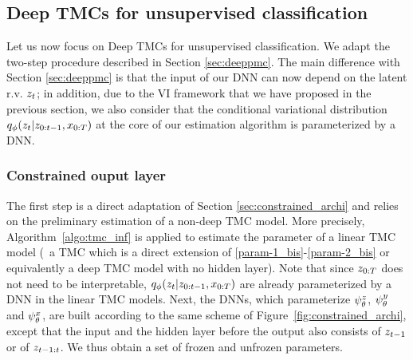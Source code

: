 \subsection{Deep TMCs for unsupervised classification}
\label{sec-deep-tmc}
Let us now focus on Deep TMCs for unsupervised classification.
We adapt the two-step procedure described in Section \ref{sec:deeppmc}. The main
difference with Section \ref{sec:deeppmc} is that the input of our DNN can now depend on the latent r.v. $z_t$; in addition, 
due to the VI framework that we have proposed in the previous section, we also consider that the conditional variational distribution $q_\phi(z_t|z_{0:t-1},x_{0:T})$ at the
core of our estimation algorithm is parameterized by a DNN.


\subsubsection{Constrained ouput layer}
\label{constraint-tmc}
The first step is a direct adaptation of Section \ref{sec:constrained_archi} and relies on the preliminary estimation of a non-deep TMC model.
More precisely,  Algorithm~\ref{algo:tmc_inf}
is applied to estimate the parameter of a linear TMC model
(\ie~a TMC which is a direct extension of \eqref{param-1_bis}-\eqref{param-2_bis} or equivalently a deep TMC model with no hidden layer). Note that since $z_{0:T}$ does not need to 
be interpretable, $q_\phi(z_t|z_{0:t-1},x_{0:T})$ are
already parameterized by a DNN in the linear TMC models. Next, the DNNs, which parameterize
$\psi^{z}_{\theta}$, $\psi^{y}_{\theta}$ and $\psi^{x}_{\theta}$, are built according to the same scheme of Figure~\ref{fig:constrained_archi}, except that the input and the hidden layer before the output also consists of $z_{t-1}$ or of $z_{t-1:t}$.
We thus obtain a set of frozen and unfrozen parameters.

